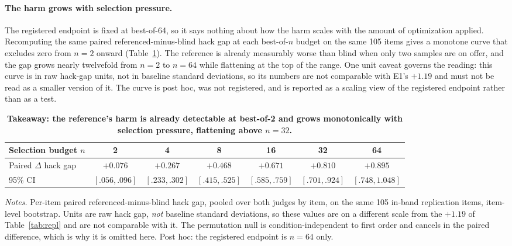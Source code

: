 \documentclass[11pt]{article}
\begin{document}
\paragraph{The harm grows with selection pressure.}
The registered endpoint is fixed at best-of-64, so it says nothing about how the harm scales with the amount of optimization applied.
Recomputing the same paired referenced-minus-blind hack gap at each best-of-$n$ budget on the same 105 items gives a monotone curve that excludes zero from $n{=}2$ onward (Table~\ref{tab:pressure}).
The reference is already measurably worse than blind when only two samples are on offer, and the gap grows nearly twelvefold from $n{=}2$ to $n{=}64$ while flattening at the top of the range.
One unit caveat governs the reading: this curve is in raw hack-gap units, not in baseline standard deviations, so its numbers are not comparable with E1's $+1.19$ and must not be read as a smaller version of it.
The curve is post hoc, was not registered, and is reported as a scaling view of the registered endpoint rather than as a test.

\begin{table}[tbp]
\centering
\small
\setlength{\tabcolsep}{5pt}
\begin{tabular}{lcccccc}
\toprule
Selection budget $n$ & 2 & 4 & 8 & 16 & 32 & 64 \\
\midrule
Paired $\Delta$ hack gap & $+0.076$ & $+0.267$ & $+0.468$ & $+0.671$ & $+0.810$ & $+0.895$ \\
95\% CI & {\scriptsize$[.056, .096]$} & {\scriptsize$[.233, .302]$} & {\scriptsize$[.415, .525]$} & {\scriptsize$[.585, .759]$} & {\scriptsize$[.701, .924]$} & {\scriptsize$[.748, 1.048]$} \\
\bottomrule
\end{tabular}

\medskip
\begin{minipage}{0.97\textwidth}
\footnotesize
\emph{Notes.}
Per-item paired referenced-minus-blind hack gap, pooled over both judges by item, on the same 105 in-band replication items, item-level bootstrap.
Units are raw hack gap, \emph{not} baseline standard deviations, so these values are on a different scale from the $+1.19$ of Table~\ref{tab:repl} and are not comparable with it.
The permutation null is condition-independent to first order and cancels in the paired difference, which is why it is omitted here.
Post hoc: the registered endpoint is $n{=}64$ only.
\end{minipage}
\caption{\textbf{Takeaway: the reference's harm is already detectable at best-of-2 and grows monotonically with selection pressure, flattening above $n{=}32$.}}
\label{tab:pressure}
\end{table}
\end{document}

